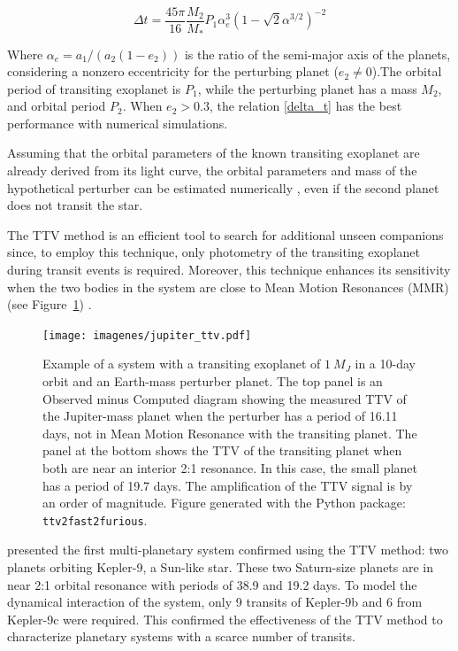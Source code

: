 \begin{equation}
\Delta t = \frac{45\pi}{16} \frac{M_2}{M_*} P_{1} \alpha^3_{e} (1-	\sqrt{2}\alpha^{3/2})^{-2}
\label{delta_t}
\end{equation}

Where $\alpha_e = a_1/(a_2(1-e_2))$ is the ratio of the semi-major axis of the planets, considering a nonzero eccentricity for the perturbing planet ($e_2 \neq 0$).The orbital period of transiting exoplanet is $P_1$, while the perturbing planet has a mass $M_2$, and orbital period $P_2$. When $e_2>0.3$, the relation \ref{delta_t} has the best performance with numerical simulations. 

Assuming that the orbital parameters of the known transiting exoplanet are already derived from its light curve, the orbital parameters and mass of the hypothetical perturber can be estimated numerically \citep{Nesvorny2008,Nesvorny2009}, even if the second planet does not transit the star. 

The TTV method is an efficient tool to search for additional unseen companions since, to employ this technique, only photometry of the transiting exoplanet during transit events is required. Moreover, this technique enhances its sensitivity when the two bodies in the system are close to Mean Motion Resonances (MMR) \citep{Agol2005,Steffen2005,Agol2007} (see Figure~\ref{rms_ttv_amplitude}) . 

\begin{figure}[ht]
\centering
\texttt{[image: imagenes/jupiter\_ttv.pdf]}
\caption{Example of a system with a transiting exoplanet of $1~M_{J}$ in a 10-day orbit and an Earth-mass perturber planet. The top panel is an Observed minus Computed diagram showing the measured TTV of the Jupiter-mass planet when the perturber has a period of 16.11 days, not in Mean Motion Resonance with the transiting planet. The panel at the bottom shows the TTV of the transiting planet when both are near an interior 2:1 resonance. In this case, the small planet has a period of 19.7 days. The amplification of the TTV signal is by an order of magnitude. Figure generated with the Python package: \texttt{ttv2fast2furious}.}
\label{rms_ttv_amplitude}
\end{figure}

\cite{Holman2010} presented the first multi-planetary system confirmed using the TTV method: two planets orbiting Kepler-9, a Sun-like star. These two Saturn-size planets are in near 2:1 orbital resonance with periods of 38.9 and 19.2 days. To model the dynamical interaction of the system, only 9 transits of Kepler-9b and 6 from Kepler-9c were required. This confirmed the effectiveness of the TTV method to characterize planetary systems with a scarce number of transits.


